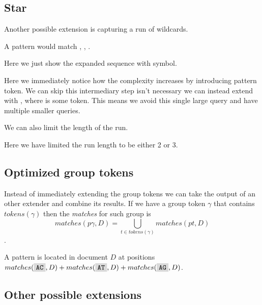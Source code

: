 \subsection{Star}

Another possible extension is capturing a run of wildcards.

\begin{exmp}
A pattern  would match , , .
\end{exmp}

Here we just show the expanded sequence with \R{*} symbol.

\begin{figure}[H]
	
\end{figure}

Here we immediately notice how the complexity increases by introducing pattern token.  We can skip this intermediary step isn't necessary we can instead extend with , where  is some token. This means we avoid this single large query and have multiple smaller queries.

\begin{figure}[H]
	
\end{figure}

We can also limit the length of the run.

\begin{figure}[H]
	
\end{figure}

Here we have limited the run length to be either 2 or 3.

\subsection{Optimized group tokens}

Instead of immediately extending the group tokens we can take the output of an other extender and combine its results. If we have a group token $\gamma$ that contains $tokens(\gamma)$ then the \emph{matches} for such group is $$matches(p\gamma, D) = \bigcup_{t \in tokens(\gamma)} matches(pt, D) $$.

\begin{exmp}
A pattern  is located in document $D$ at positions $matches(\R{AC}, D) + matches(\R{AT}, D) + matches(\R{AG}, D)$.
\end{exmp}

\subsection{Other possible extensions}

